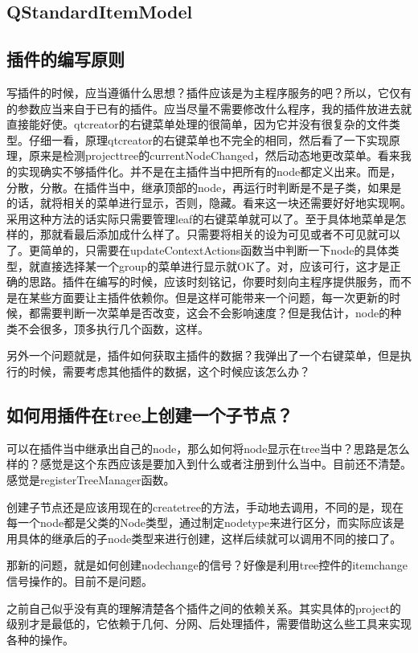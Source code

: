 \subsection{QStandardItemModel}
\subsection{插件的编写原则}
写插件的时候，应当遵循什么思想？插件应该是为主程序服务的吧？所以，它仅有的参数应当来自于已有的插件。应当尽量不需要修改什么程序，我的插件放进去就直接能好使。qtcreator的右键菜单处理的很简单，因为它并没有很复杂的文件类型。仔细一看，原理qtcreator的右键菜单也不完全的相同，然后看了一下实现原理，原来是检测projecttree的currentNodeChanged，然后动态地更改菜单。看来我的实现确实不够插件化。并不是在主插件当中把所有的node都定义出来。而是，分散，分散。在插件当中，继承顶部的node，再运行时判断是不是子类，如果是的话，就将相关的菜单进行显示，否则，隐藏。看来这一块还需要好好地实现啊。采用这种方法的话实际只需要管理leaf的右键菜单就可以了。至于具体地菜单是怎样的，那就看最后添加成什么样了。只需要将相关的设为可见或者不可见就可以了。更简单的，只需要在updateContextActions函数当中判断一下node的具体类型，就直接选择某一个group的菜单进行显示就OK了。对，应该可行，这才是正确的思路。插件在编写的时候，应该时刻铭记，你要时刻向主程序提供服务，而不是在某些方面要让主插件依赖你。但是这样可能带来一个问题，每一次更新的时候，都需要判断一次菜单是否改变，这会不会影响速度？但是我估计，node的种类不会很多，顶多执行几个函数，这样。

另外一个问题就是，插件如何获取主插件的数据？我弹出了一个右键菜单，但是执行的时候，需要考虑其他插件的数据，这个时候应该怎么办？
\subsection{如何用插件在tree上创建一个子节点？}
可以在插件当中继承出自己的node，那么如何将node显示在tree当中？思路是怎么样的？感觉是这个东西应该是要加入到什么或者注册到什么当中。目前还不清楚。感觉是registerTreeManager函数。

创建子节点还是应该用现在的createtree的方法，手动地去调用，不同的是，现在每一个node都是父类的Node类型，通过制定nodetype来进行区分，而实际应该是用具体的继承后的子node类型来进行创建，这样后续就可以调用不同的接口了。

那新的问题，就是如何创建nodechange的信号？好像是利用tree控件的itemchange信号操作的。目前不是问题。

之前自己似乎没有真的理解清楚各个插件之间的依赖关系。其实具体的project的级别才是最低的，它依赖于几何、分网、后处理插件，需要借助这么些工具来实现各种的操作。
